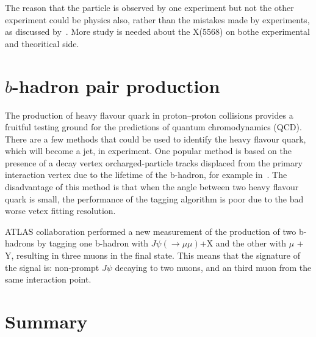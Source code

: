 \documentclass[epj]{webofc}
\begin{document}
The reason that the particle is observed by one experiment but not the other experiment could be physics also, rather than the mistakes
made by experiments, as discussed by~\cite{Yang:2016sws}\cite{Ke:2018stp}. More study is needed about the X(5568) on bothe experimental and theoritical side. 


\section{$b$-hadron pair production}

The production of heavy flavour quark in proton–proton collisions provides a fruitful testing ground for the predictions of quantum chromodynamics (QCD).
There are a few methods that could be used to identify the heavy flavour quark, which will become a jet, in experiment. 
One popular method is based on the presence of a decay vertex orcharged-particle tracks displaced from the primary interaction vertex 
due to the lifetime of the b-hadron, for example in~\cite{Aaboud:2016jed}. The disadvantage of this method is that when the angle
between two heavy flavour quark is small, the performance of the tagging algorithm is poor due to the bad worse vetex fitting resolution. 

ATLAS collaboration performed a new measurement of the production of two b-hadrons by tagging one b-hadron with $J\psi (\to \mu \mu)$+X and the other with $\mu$ + Y, 
resulting in three muons in the final state. This means that the signature of the signal is: non-prompt $J\psi$ decaying to two muons, and an third muon from the same
interaction point.

 

\section{Summary}
\label{sum}
\end{document}
